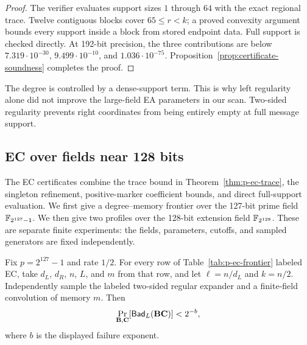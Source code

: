 \begin{proof}
The verifier evaluates support sizes $1$ through $64$ with the exact regional
trace.  Twelve contiguous blocks cover $65\leq r<k$; a proved convexity
argument bounds every support inside a block from stored endpoint data.  Full
support is checked directly.  At 192-bit precision, the three contributions are below
$7.319\cdot10^{-30}$, $9.499\cdot10^{-10}$, and
$1.036\cdot10^{-75}$.  Proposition~\ref{prop:certificate-soundness} completes
the proof.
\end{proof}

The degree is controlled by a dense-support term.  This is why left
regularity alone did not improve the large-field EA parameters in our scan.
Two-sided regularity prevents right coordinates from being entirely empty at
full message support.

\subsection{EC over fields near 128 bits}

The EC certificates combine the trace bound in
Theorem~\ref{thm:p-ec-trace}, the singleton refinement, positive-marker
coefficient bounds, and direct full-support evaluation.
We first give a degree--memory frontier over the 127-bit prime field
$\mathbb F_{2^{127}-1}$.  We then give two profiles over the 128-bit extension field
$\mathbb F_{2^{128}}$.  These are separate finite experiments: the fields,
parameters, cutoffs, and sampled generators are fixed independently.

\begin{theorem}
\label{thm:p-ec-certificates}
Fix $p=2^{127}-1$ and rate $1/2$.  For every row of
Table~\ref{tab:p-ec-frontier} labeled EC, take $d_L$, $d_R$, $n$, $L$, and
$m$ from that row, and let $\ell=n/d_L$ and $k=n/2$.  Independently sample
the labeled two-sided regular expander and a finite-field convolution of
memory $m$.  Then
\begin{equation}
 \Pr_{\mathbf B,\mathbf C}[\mathsf{Bad}_L(\mathbf B\mathbf C)]<2^{-b},
\end{equation}
where $b$ is the displayed failure exponent.
\end{theorem}


